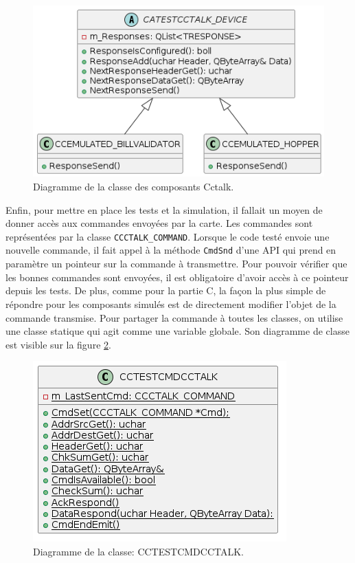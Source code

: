 \documentclass[a4paper]{article}
\begin{document}
\begin{figure}[h!]
  \begin{center}
  \includegraphics[scale=0.5]{./graphs/simulation_cctalk.png}
    \caption{Diagramme de la classe des composants Cctalk.}
    \label{fig:simucctalk}
  \end{center}
\end{figure}

Enfin, pour mettre en place les tests et la simulation, il fallait un moyen de
donner accès aux commandes envoyées par la carte. Les commandes sont
représentées par la classe \verb|CCCTALK_COMMAND|. Lorsque le code testé envoie
une nouvelle commande, il fait appel à la méthode \verb|CmdSnd| d'une API qui
prend en paramètre un pointeur sur la commande à transmettre. Pour pouvoir
vérifier que les bonnes commandes sont envoyées, il est obligatoire d'avoir accès
à ce pointeur depuis les tests. De plus, comme pour la partie C, la façon la
plus simple de répondre pour les composants simulés est de directement modifier
l'objet de la commande transmise. Pour partager la commande à toutes les
classes, on utilise une classe statique qui agit comme une variable globale. Son
diagramme de classe est visible sur la figure \ref{fig:testcctalkcmd}.

\begin{figure}[h!]
  \begin{center}
  \includegraphics[scale=0.5]{./graphs/testcctalkcmd.png}
    \caption{Diagramme de la classe: CCTESTCMDCCTALK.}
    \label{fig:testcctalkcmd}
  \end{center}
\end{figure}
\end{document}
